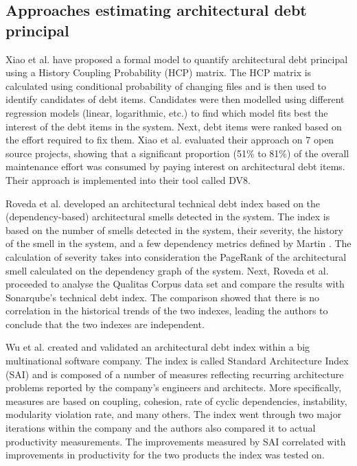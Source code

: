 \subsection{Approaches estimating architectural debt principal}\label{c6:sec:related-work-atd}
Xiao et al. \cite{Xiao2016} have proposed a formal model to quantify architectural debt principal using a History Coupling Probability (HCP) matrix.
The HCP matrix is calculated using conditional probability of changing files and is then used to identify candidates of debt items.
Candidates were then modelled using different regression models (linear, logarithmic, etc.) to find which model fits best the interest of the debt items in the system.
Next, debt items were ranked based on the effort required to fix them.
Xiao et al. evaluated their approach on 7 open source projects, showing that a significant proportion (51\% to 81\%) of the overall maintenance effort was consumed by paying interest on architectural debt items.
Their approach is implemented into their tool called DV8.

Roveda et al. \cite{Roveda2018} developed an architectural technical debt index based on the (dependency-based) architectural smells detected in the system.
The index is based on the number of smells detected in the system, their severity, the history of the smell in the system, and a few dependency metrics defined by Martin \cite{Martin2018}.
The calculation of severity takes into consideration the PageRank of the architectural smell calculated on the dependency graph of the system.
Next, Roveda et al. proceeded to analyse the Qualitas Corpus data set \cite{Terra2013,Tempero2010} and compare the results with Sonarqube's technical debt index.
The comparison showed that there is no correlation in the historical trends of the two indexes, leading the authors to conclude that the two indexes are independent.

Wu et al. \cite{Wu2018} created and validated an architectural debt index within a big multinational software company.
The index is called Standard Architecture Index (SAI) and is composed of a number of measures reflecting recurring architecture problems reported by the company's engineers and architects.
More specifically, measures are based on coupling, cohesion, rate of cyclic dependencies, instability, modularity violation rate, and many others.
The index went through two major iterations within the company and the authors also compared it to actual productivity measurements.
The improvements measured by SAI correlated with improvements in productivity for the two products the index was tested on.

